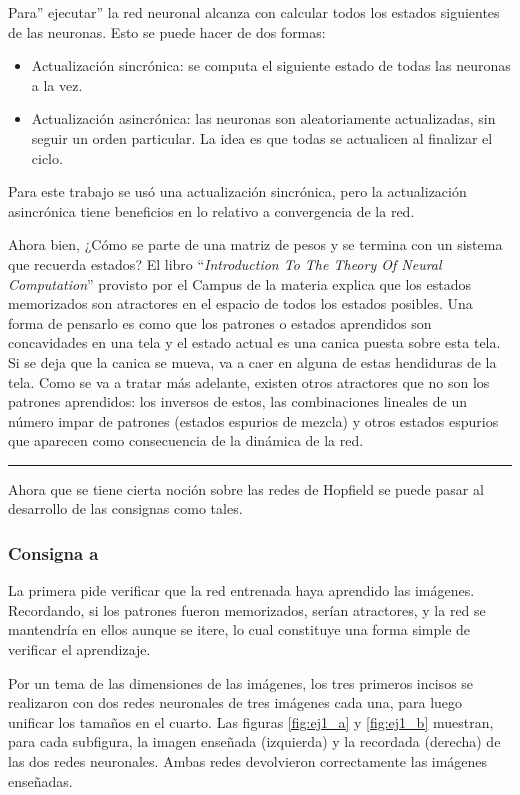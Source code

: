 \documentclass[11pt]{article} %
\begin{document}
Para'' ejecutar'' la red neuronal alcanza con calcular todos los estados siguientes de las neuronas. Esto se puede hacer de dos formas:
\begin{itemize}
\item Actualización sincrónica: se computa el siguiente estado de todas las neuronas a la vez.
\item Actualización asincrónica: las neuronas son aleatoriamente actualizadas, sin seguir un orden particular. La idea es que todas se actualicen al finalizar el ciclo. 
\end{itemize}

Para este trabajo se usó una actualización sincrónica, pero la actualización asincrónica tiene beneficios en lo relativo a convergencia de la red. 

Ahora bien, ¿Cómo se parte de una matriz de pesos y se termina con un sistema que recuerda estados? El libro ``\textit{Introduction To The Theory Of Neural Computation}'' provisto por el Campus de la materia explica que los estados memorizados son atractores en el espacio de todos los estados posibles. Una forma de pensarlo es como que los patrones o estados aprendidos son concavidades en una tela y el estado actual es una canica puesta sobre esta tela. Si se deja que la canica se mueva, va a caer en alguna de estas hendiduras de la tela. Como se va a tratar más adelante, existen otros atractores que no son los patrones aprendidos: los inversos de estos, las combinaciones lineales de un número impar de patrones (estados espurios de mezcla) y otros estados espurios que aparecen como consecuencia de la dinámica de la red.

\begin{center}
\rule{0.5\linewidth}{0.5pt} %
\end{center}

Ahora que se tiene cierta noción sobre las redes de Hopfield se puede pasar al desarrollo de las consignas como tales. 

\subsubsection{Consigna a}
La primera pide verificar que la red entrenada haya aprendido las imágenes. Recordando, si los patrones fueron memorizados, serían atractores, y la red se mantendría en ellos aunque se itere, lo cual constituye una forma simple de verificar el aprendizaje. 

Por un tema de las dimensiones de las imágenes, los tres primeros incisos se realizaron con dos redes neuronales de tres imágenes cada una, para luego unificar los tamaños en el cuarto. Las figuras \ref{fig:ej1_a} y \ref{fig:ej1_b} muestran, para cada subfigura, la imagen enseñada (izquierda) y la recordada (derecha) de las dos redes neuronales. Ambas redes devolvieron correctamente las imágenes enseñadas. 
\end{document}
